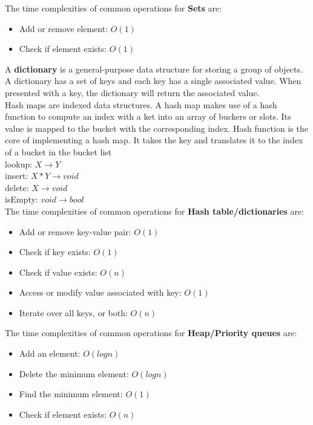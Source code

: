 \documentclass{article}
\begin{document}
The time complexities of common operations for \textbf{Sets} are:
\begin{itemize}
    \item Add or remove element: $O(1)$
    \item Check if element exists: $O(1)$
\end{itemize}

A \textbf{dictionary} is a general-purpose data structure for storing a group of objects. A dictionary has a set of keys and each key has a single associated value. When presented with a key, the dictionary will return the associated value. \\

Hash maps are indexed data structures. A hash map makes use of a hash function to compute an index with a ket into an array of buckers or slots. Its value is mapped to the bucket with the corresponding index. Hash function is the core of implementing a hash map. It takes the key and translates it to the index of a bucket in the bucket list \\



lookup: $X \rightarrow Y$ \\
insert: $X * Y \rightarrow void$ \\
delete: $X \rightarrow void$ \\
isEmpty: $void \rightarrow bool$ \\

The time complexities of common operations for \textbf{Hash table/dictionaries} are:
\begin{itemize}
    \item Add or remove key-value pair: $O(1)$
    \item Check if key exists: $O(1)$
    \item Check if value exists: $O(n)$
    \item Access or modify value associated with key: $O(1)$
    \item Iterate over all keys, or both: $O(n)$
\end{itemize}

The time complexities of common operations for \textbf{Heap/Priority queues } are:
\begin{itemize}
    \item Add an element: $O(logn)$
    \item Delete the minimum element: $O(logn)$
    \item Find the minimum element: $O(1)$
    \item Check if element exists: $O(n)$
\end{itemize}
\end{document}
